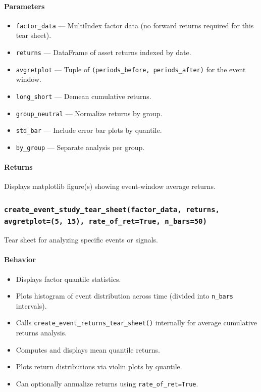\documentclass[11pt]{article}
\begin{document}
\paragraph{Parameters}
\begin{itemize}
  \item \texttt{factor\_data} --- MultiIndex factor data (no forward returns required for this tear sheet).
  \item \texttt{returns} --- DataFrame of asset returns indexed by date.
  \item \texttt{avgretplot} --- Tuple of \texttt{(periods\_before, periods\_after)} for the event window.
  \item \texttt{long\_short} --- Demean cumulative returns.
  \item \texttt{group\_neutral} --- Normalize returns by group.
  \item \texttt{std\_bar} --- Include error bar plots by quantile.
  \item \texttt{by\_group} --- Separate analysis per group.
\end{itemize}

\paragraph{Returns}
Displays matplotlib figure(s) showing event-window average returns.

\subsubsection{\texttt{create\_event\_study\_tear\_sheet(factor\_data, returns, avgretplot=(5, 15), rate\_of\_ret=True, n\_bars=50)}}
Tear sheet for analyzing specific events or signals.

\paragraph{Behavior}
\begin{itemize}
  \item Displays factor quantile statistics.
  \item Plots histogram of event distribution across time (divided into \texttt{n\_bars} intervals).
  \item Calls \texttt{create\_event\_returns\_tear\_sheet()} internally for average cumulative returns analysis.
  \item Computes and displays mean quantile returns.
  \item Plots return distributions via violin plots by quantile.
  \item Can optionally annualize returns using \texttt{rate\_of\_ret=True}.
\end{itemize}
\end{document}
